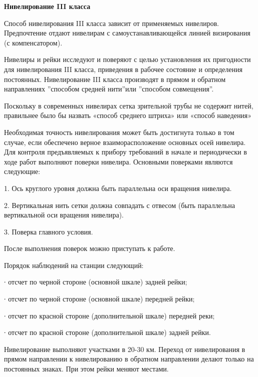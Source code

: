 \documentclass[a4paper]{article}
\begin{document}
\begin{newpage}

    \large{
        \begin{center}
            \textbf{Нивелирование III класса}
        \end{center}
        
        \par Способ нивелирования III класса зависит от применяемых нивелиров. Предпочтение отдают нивелирам с самоустанавливающейся линией визирования (с компенсатором).
        \par Нивелиры и рейки исследуют и поверяют с целью установления их пригодности для нивелирования III класса, приведения в рабочее состояние и определения постоянных. Нивелирование III класса производят в прямом и обратном направлениях ”способом средней нити”или ”способом совмещения”.
        \par Поскольку в современных нивелирах сетка зрительной трубы не содержит нитей, правильнее было бы назвать «способ среднего штриха» или «способ наведения»
        \par Необходимая точность нивелирования может быть достигнута только в том случае, если обеспечено верное взаиморасположение основных осей нивелира. Для контроля предъявляемых к прибору требований в начале и периодически в ходе работ выполняют поверки нивелира. Основными поверками являются следующие:
        \par 1. Ось круглого уровня должна быть параллельна оси вращения нивелира.
        \par 2. Вертикальная нить сетки должна совпадать с отвесом (быть параллельна вертикальной оси вращения нивелира).
        \par 3. Поверка главного условия.
        \par После выполнения поверок можно приступать к работе.
        \par Порядок наблюдений на станции следующий:
        \par ∙ отсчет по черной стороне (основной шкале) задней рейки;
        \par ∙ отсчет по черной стороне (основной шкале) передней рейки;
        \par ∙ отсчет по красной стороне (дополнительной шкале) передней реки;
        \par ∙ отсчет по красной стороне (дополнительной шкале) задней рейки.
        \par Нивелирование выполняют участками в 20-30 км. Переход от нивелирования в прямом направлении к нивелированию в обратном направлении делают только на постоянных знаках. При этом рейки меняют местами.
}
\end{newpage}
\end{document}
